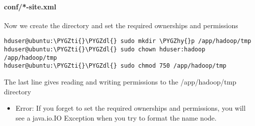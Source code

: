 \documentclass[letterpaper,10pt,english]{sphinxmanual}
\def\PYGZdl{\char`\$}
\def\PYGZhy{\char`\-}
\def\PYGZti{\char`\~}
\begin{document}
\paragraph{conf/{\color{red}\bfseries{}*}-site.xml}
\label{hadoop:conf-site-xml}
Now we create the directory and set the required ownerships and permissions

\begin{Verbatim}[commandchars=\\\{\}]
hduser@ubuntu:\PYGZti{}\PYGZdl{} sudo mkdir \PYGZhy{}p /app/hadoop/tmp
hduser@ubuntu:\PYGZti{}\PYGZdl{} sudo chown hduser:hadoop /app/hadoop/tmp
hduser@ubuntu:\PYGZti{}\PYGZdl{} sudo chmod 750 /app/hadoop/tmp
\end{Verbatim}

The last line gives reading and writing permissions to the /app/hadoop/tmp directory
\begin{itemize}
\item {} 
Error: If you forget to set the required ownerships and permissions, you will see a java.io.IO Exception when you try to format the name node.

\end{itemize}
\end{document}
